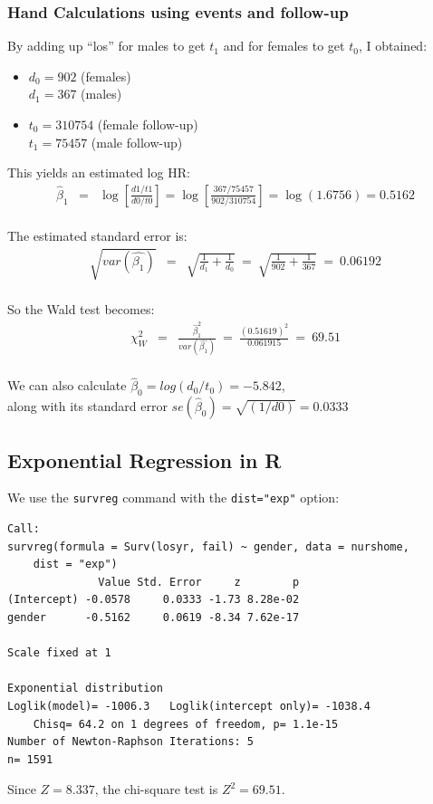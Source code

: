 \documentclass[11pt,psfig]{book}
\begin{document}
\subsubsection{Hand Calculations using events and follow-up}
By adding up ``{\sc los}'' for males to get $t_1$ and for
females to get $t_0$, I obtained:
\begin{itemize}
\item $d_0 = 902$ (females)\\
      $d_1 = 367$ (males)
\item $t_0 = 310754$ (female follow-up)\\
      $t_1 = 75457$ (male follow-up)
\end{itemize}
This yields an estimated log HR:
\begin{eqnarray*}
\hat\beta_1 & = & \log \left[ \frac{d1/t1}{d0/t0} \right]
= \log \left[ \frac{367/75457}{902/310754} \right]
= \log (1.6756) = 0.5162
\end{eqnarray*}
\\[2ex]
The estimated standard error is:
\begin{eqnarray*}
\sqrt{var(\hat{\beta_1})} & = & \sqrt{\frac{1}{d_1} + \frac{1}{d_0}}
~=~ \sqrt{\frac{1}{902} + \frac{1}{367}}
~=~ 0.06192
\end{eqnarray*}
\\[2ex]
So the Wald test becomes:
\begin{eqnarray*}
\chi^2_W & = & \frac{\hat{\beta}_1^2}{var(\hat{\beta_1})}
 ~ = ~ \frac{(0.51619)^2}{0.061915} ~=~ 69.51
\end{eqnarray*}
\\[2ex]
We can also calculate $\hat\beta_0= log(d_0/t_0) = -5.842$,\\
along with its standard error $se(\hat\beta_0)=\sqrt{(1/d0)} = 0.0333$
\subsection{Exponential Regression in R }
We use the {\tt survreg} command with the {\tt dist="exp"} option:
\small
\begin{verbatim}
Call:
survreg(formula = Surv(losyr, fail) ~ gender, data = nurshome,
    dist = "exp")
              Value Std. Error     z        p
(Intercept) -0.0578     0.0333 -1.73 8.28e-02
gender      -0.5162     0.0619 -8.34 7.62e-17

Scale fixed at 1

Exponential distribution
Loglik(model)= -1006.3   Loglik(intercept only)= -1038.4
	Chisq= 64.2 on 1 degrees of freedom, p= 1.1e-15
Number of Newton-Raphson Iterations: 5
n= 1591
\end{verbatim}
Since $Z=8.337$, the chi-square test is $Z^2=69.51$.
\end{document}
